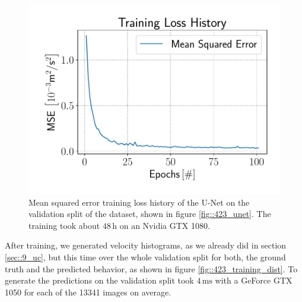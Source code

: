 \begin{figure}[h!]
	\centering
	\includegraphics[scale=.4]{chapters/11_autonomous_walking_experiments/img/05_07_19_loss_history.pdf}
	\caption{Mean squared error training loss history of the U-Net on the validation split of the dataset, shown in figure \ref{fig::423_unet}. The training took about $48\,\text{h}$ on an Nvidia GTX 1080.}
	\label{fig::423_loss}
\end{figure}
After training, we generated velocity histograms, as we already did in section \ref{sec::9_uc}, but this time over the whole validation split for both, the ground truth and the predicted behavior, as shown in figure \ref{fig::423_training_dist}. To generate the predictions on the validation split took $4\,\text{ms}$ with a GeForce GTX 1050 for each of the 13341 images on average.
